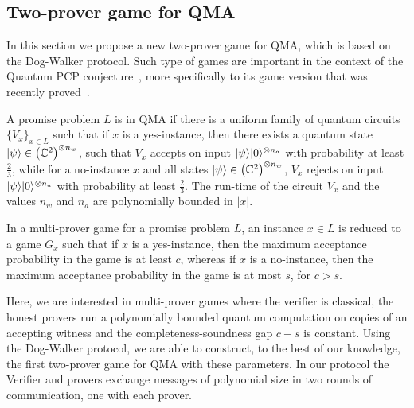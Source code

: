 \newpage


\subsection{Two-prover game for QMA}\label{sec:qma}

In this section we propose a new two-prover game for QMA, which is based on the Dog-Walker
protocol. Such type of games are important in the context of the Quantum PCP conjecture~\cite{AharonovAV13}, more specifically to its game version that was recently proved~\cite{NatarajanV18}.


A promise problem $L$ is in QMA if there is a uniform family
of quantum circuits $\{V_x\}_{x \in L}$ such that if $x$ is a yes-instance, then there exists a
quantum state $|\psi\rangle \in \left(\mathbb{C}^2\right)^{\otimes n_w}$, such that
$V_x$  accepts on input $|\psi\rangle|0\rangle^{\otimes n_a}$ with probability at least
$\frac{2}{3}$, while for a no-instance $x$ and  all states $|\psi\rangle \in
\left(\mathbb{C}^2\right)^{\otimes n_w}$, $V_x$
rejects on input $|\psi\rangle|0\rangle^{\otimes n_a}$ with probability at
least $\frac{2}{3}$. The run-time of the circuit $V_x$ and the values $n_w$ and $n_a$ are polynomially bounded in $|x|$.

 In a multi-prover game for a promise problem $L$, an
 instance $x \in L$ is reduced to a game $G_x$ such that if $x$ is a yes-instance, then the maximum
 acceptance probability in the game is at least $c$, whereas if $x$ is a
 no-instance,
 then the maximum acceptance probability in the game is  at most $s$, for $c
 > s$.

 Here, we are interested in multi-prover games where the verifier is classical,
 the honest provers run a polynomially bounded quantum computation on copies
 of an accepting witness and the completeness-soundness gap $c-s$ is constant.
Using the Dog-Walker protocol, we are able to construct, to the best of our knowledge, the first two-prover
game for QMA with these parameters. In our protocol the Verifier and provers exchange messages of polynomial size 
in two rounds of communication, one with each
prover.

